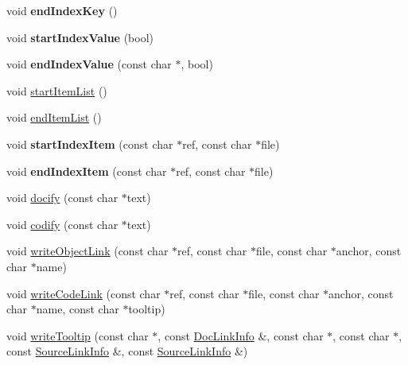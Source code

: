 \begin{DoxyCompactItemize}
void {\bfseries end\+Index\+Key} ()
\item 
\mbox{\label{class_r_t_f_generator_a7eaa22d62032e7783ddce216aaae5c9a}} 
void {\bfseries start\+Index\+Value} (bool)
\item 
\mbox{\label{class_r_t_f_generator_a0fd9b7f98db0eb16bd0e5d67696c4def}} 
void {\bfseries end\+Index\+Value} (const char $\ast$, bool)
\item 
void \mbox{\hyperlink{class_r_t_f_generator_a277db06db2dc29602f3209ca899111c9}{start\+Item\+List}} ()
\item 
void \mbox{\hyperlink{class_r_t_f_generator_a530e2868f7db6b92a4423cdee7fc9f75}{end\+Item\+List}} ()
\item 
\mbox{\label{class_r_t_f_generator_afdc11b7bd35a07d07d516e7f746b0b23}} 
void {\bfseries start\+Index\+Item} (const char $\ast$ref, const char $\ast$file)
\item 
\mbox{\label{class_r_t_f_generator_a41f94838ad89b0979c7fdb5e7d31d792}} 
void {\bfseries end\+Index\+Item} (const char $\ast$ref, const char $\ast$file)
\item 
void \mbox{\hyperlink{class_r_t_f_generator_a0e292cd3d60599a4ddfad4036c0b6d46}{docify}} (const char $\ast$text)
\item 
void \mbox{\hyperlink{class_r_t_f_generator_a331ca74e622c48bbbcad7e02139a6bfb}{codify}} (const char $\ast$text)
\item 
void \mbox{\hyperlink{class_r_t_f_generator_a5b27737ba89d55761a9908a088631367}{write\+Object\+Link}} (const char $\ast$ref, const char $\ast$file, const char $\ast$anchor, const char $\ast$name)
\item 
void \mbox{\hyperlink{class_r_t_f_generator_ad598f8811fde4d3b1849c2e9b92a6686}{write\+Code\+Link}} (const char $\ast$ref, const char $\ast$file, const char $\ast$anchor, const char $\ast$name, const char $\ast$tooltip)
\item 
void \mbox{\hyperlink{class_r_t_f_generator_a06e0455dd78d9d79ea51e6d31e6877fe}{write\+Tooltip}} (const char $\ast$, const \mbox{\hyperlink{struct_doc_link_info}{Doc\+Link\+Info}} \&, const char $\ast$, const char $\ast$, const \mbox{\hyperlink{struct_source_link_info}{Source\+Link\+Info}} \&, const \mbox{\hyperlink{struct_source_link_info}{Source\+Link\+Info}} \&)
\item 

\end{DoxyCompactItemize}
